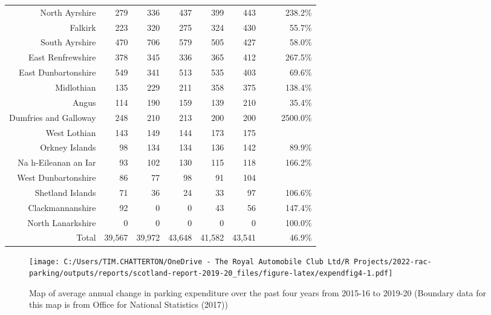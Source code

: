 \documentclass[
  12pt,
]{article}
\begin{document}
\begin{longtable}[t]{rrrrrrrrr}
North Ayrshire & 279 & 336 & 437 & 399 & 443 & \cellcolor{white}{ 11.0\%} & \cellcolor{white}{ 12.3\%} & 238.2\%\\
Falkirk & 223 & 320 & 275 & 324 & 430 & \cellcolor{white}{ 32.7\%} & \cellcolor{white}{ 17.8\%} & 55.7\%\\
South Ayrshire & 470 & 706 & 579 & 505 & 427 & \cellcolor{white}{-15.4\%} & \cellcolor{white}{ -2.4\%} & 58.0\%\\
East Renfrewshire & 378 & 345 & 336 & 365 & 412 & \cellcolor{white}{ 12.9\%} & \cellcolor{white}{  2.2\%} & 267.5\%\\
East Dunbartonshire & 549 & 341 & 513 & 535 & 403 & \cellcolor{white}{-24.7\%} & \cellcolor{white}{ -7.4\%} & 69.6\%\\
Midlothian & 135 & 229 & 211 & 358 & 375 & \cellcolor{white}{  4.7\%} & \cellcolor{white}{ 29.1\%} & 138.4\%\\
Angus & 114 & 190 & 159 & 139 & 210 & \cellcolor{white}{ 51.1\%} & \cellcolor{white}{ 16.5\%} & 35.4\%\\
Dumfries and Galloway & 248 & 210 & 213 & 200 & 200 & \cellcolor{white}{  0.0\%} & \cellcolor{white}{ -5.2\%} & 2500.0\%\\
West Lothian & 143 & 149 & 144 & 173 & 175 & \cellcolor{white}{  1.2\%} & \cellcolor{white}{  5.2\%} & \\
Orkney Islands & 98 & 134 & 134 & 136 & 142 & \cellcolor{white}{  4.4\%} & \cellcolor{white}{  9.7\%} & 89.9\%\\
Na h-Eileanan an Iar & 93 & 102 & 130 & 115 & 118 & \cellcolor{white}{  2.6\%} & \cellcolor{white}{  6.1\%} & 166.2\%\\
West Dunbartonshire & 86 & 77 & 98 & 91 & 104 & \cellcolor{white}{ 14.3\%} & \cellcolor{white}{  4.9\%} & \\
Shetland Islands & 71 & 36 & 24 & 33 & 97 & \cellcolor{white}{193.9\%} & \cellcolor{white}{  8.1\%} & 106.6\%\\
Clackmannanshire & 92 & 0 & 0 & 43 & 56 & \cellcolor{white}{ 30.2\%} & \cellcolor{white}{-11.7\%} & 147.4\%\\
North Lanarkshire & 0 & 0 & 0 & 0 & 0 & \cellcolor{white}{  0.0\%} & \cellcolor{white}{  0.0\%} & 100.0\%\\
\midrule
Total & 39,567 & 39,972 & 43,648 & 41,582 & 43,541 & \cellcolor{white}{  4.7\%} & \cellcolor{white}{  2.4\%} & 46.9\%\\*
\end{longtable}
\endgroup{}

\begin{figure}
\centering
\texttt{[image: C:/Users/TIM.CHATTERTON/OneDrive - The Royal Automobile Club Ltd/R Projects/2022-rac-parking/outputs/reports/scotland-report-2019-20\_files/figure-latex/expendfig4-1.pdf]}
\caption{\label{fig:expendfig4}Map of average annual change in parking expenditure over the past four years from 2015-16 to 2019-20 (Boundary data for this map is from Office for National Statistics (2017))}
\end{figure}
\end{document}
